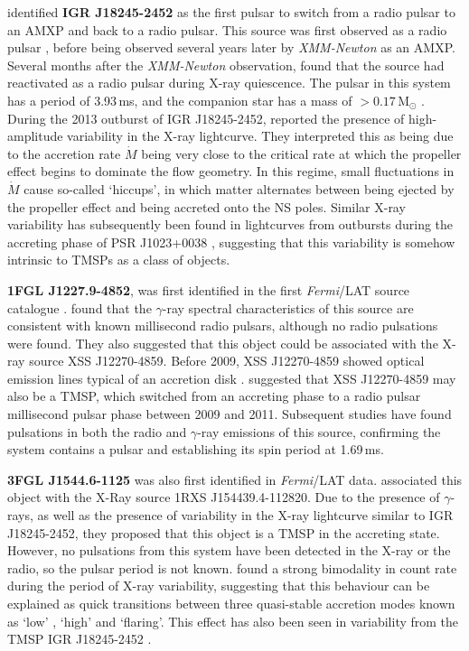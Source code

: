 \par \citealp{Papitto_Swings} identified \textbf{IGR J18245-2452} as the first pulsar to switch from a radio pulsar to an AMXP and back to a radio pulsar.   This source was first observed as a radio pulsar \citep{Manchester_PulsarCat}, before being observed several years later by \textit{XMM-Newton} \citep{Eckert_IGRJ18245} as an AMXP.  Several months after the \textit{XMM-Newton} observation, \citealp{Papitto_Finding} found that the source had reactivated as a radio pulsar during X-ray quiescence.  The pulsar in this system has a period of 3.93\,ms, and the companion star has a mass of $>0.17$\,M$_\odot$ \citep{Papitto_Swings}.  During the 2013 outburst of IGR J18245-2452, \citealp{Ferrigno_TMSPVar} reported the presence of high-amplitude variability in the X-ray lightcurve.  They interpreted this as being due to the accretion rate $\dot{M}$ being very close to the critical rate at which the propeller effect begins to dominate the flow geometry.  In this regime, small fluctuations in $\dot{M}$ cause so-called `hiccups', in which matter alternates between being ejected by the propeller effect and being accreted onto the NS poles.  Similar X-ray variability has subsequently been found in lightcurves from outbursts during the accreting phase of PSR J1023+0038 \citep{Bogdanov_TMSPVar}, suggesting that this variability is somehow intrinsic to TMSPs as a class of objects.
\par \textbf{1FGL J1227.9-4852}, was first identified in the first \textit{Fermi}/LAT source catalogue \citep{Abdo_Catalogue}.  \citealp{Hill_XSS} found that the $\gamma$-ray spectral characteristics of this source are consistent with known millisecond radio pulsars, although no radio pulsations were found.  They also suggested that this object could be associated with the X-ray source XSS J12270-4859.  Before 2009, XSS J12270-4859 showed optical emission lines typical of an accretion disk \citep{Pretorius_Optical}.  \citealp{Hill_XSS} suggested that XSS J12270-4859 may also be a TMSP, which switched from an accreting phase to a radio pulsar millisecond pulsar phase between 2009 and 2011.  Subsequent studies have found pulsations in both the radio \citep{Roy_12270Spin} and $\gamma$-ray \citep{Johnson_12270Spin} emissions of this source, confirming the system contains a pulsar and establishing its spin period at 1.69\,ms. 
\par \textbf{3FGL J1544.6-1125} was also first identified in \textit{Fermi}/LAT data.  \citealp{Bogdanov_Proxy} associated this object with the X-Ray source 1RXS J154439.4-112820.  Due to the presence of $\gamma$-rays, as well as the presence of variability in the X-ray lightcurve similar to IGR J18245-2452, they proposed that this object is a TMSP in the accreting state.  However, no pulsations from this system have been detected in the X-ray or the radio, so the pulsar period is not known.  \citealp{Bogdanov_Proxy} found a strong bimodality in count rate during the period of X-ray variability, suggesting that this behaviour can be explained as quick transitions between three quasi-stable accretion modes known as `low' , `high' and `flaring'.  This effect has also been seen in variability from the TMSP IGR J18245-2452 \citep{Ferrigno_TMSPVar}.

